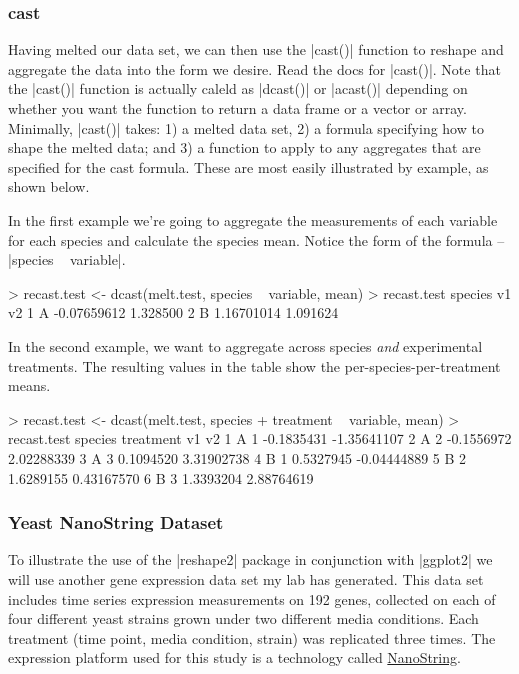 \subsubsection{cast}

Having melted our data set, we can then use the |cast()| function to reshape and aggregate the data into the form we desire.  Read the docs for |cast()|.  Note that the |cast()| function is actually caleld as |dcast()| or |acast()| depending on whether you want the function to return a data frame or a vector or array. Minimally, |cast()| takes: 1) a melted data set,  2) a formula specifying how to shape the melted data; and 3) a function to apply to any aggregates that are specified for the cast formula. These are most easily illustrated by example, as shown below.

In the first example we're going to aggregate the measurements of each variable for each species and calculate the species mean.  Notice the form of the formula -- |species ~ variable|.
%
\begin{R}
> recast.test <- dcast(melt.test, species ~ variable, mean)
> recast.test
  species          v1       v2
1       A -0.07659612 1.328500
2       B  1.16701014 1.091624
\end{R}

In the second example, we want to aggregate across species \emph{and} experimental treatments.  The resulting values in the table show the per-species-per-treatment means.
\begin{R}
> recast.test <- dcast(melt.test, species + treatment ~ variable, mean) 
> recast.test
  species treatment         v1          v2
1       A         1 -0.1835431 -1.35641107
2       A         2 -0.1556972  2.02288339
3       A         3  0.1094520  3.31902738
4       B         1  0.5327945 -0.04444889
5       B         2  1.6289155  0.43167570
6       B         3  1.3393204  2.88764619   
\end{R}



\subsubsection{Yeast NanoString Dataset}

To illustrate the use of the |reshape2| package in conjunction with |ggplot2| we will use another gene expression data set my lab has generated.  This data set includes time series expression measurements on 192 genes, collected on each of four different yeast strains grown under two different media conditions. Each treatment (time point, media condition, strain) was replicated three times.  The expression platform used for this study is a technology called \href{http://www.nanostring.com/}{NanoString}.

